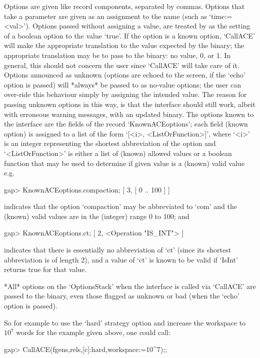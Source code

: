 \endlist

Options  are  given  like  record  components,  separated  by  commas.
Options that take a parameter are  given as an  assignment to the name
(such  as `time:=<val>').   Options passed without assigning a value,
are treated by {\GAP} as the setting of a boolean option to the value
`true'. If the option is a known {\ACE} option, `CallACE' will   make
the   appropriate  translation  to  the value expected by the  {\ACE}
binary; the appropriate translation may be to pass to the binary:  no
value, 0, or 1.  In general,  this  should not concern the user since
`CallACE' will take care of it. Options announced as unknown (options
are  echoed  to  the  screen,  if  the  `echo' option is passed) will
*always*  be  passed to  {\ACE} as no-value  options;  the  user  can
over-ride this behaviour  simply by assigning the intended value. The
reason for  passing  unknown  options in this way, is that the {\ACE} 
interface should still work,  albeit with erroneous warning messages,
with  an  updated  binary. The  {\ACE}  options  known  to the {\ACE} 
interface are the fields of the record `KnownACEoptions';  each field
(known {\ACE} option) is assigned to a list of the form
`[<i>, <ListOrFunction>]', where `<i>' is an integer representing the
shortest abbreviation of the option and `<ListOrFunction>' is  either
a list of (known) allowed values or a boolean function that  may   be 
used to determine if given value is a (known) valid value e.g.

\begintt
gap> KnownACEoptions.compaction;
[ 3, [ 0 .. 100 ] ]
\endtt

indicates that the option `compaction' may be  abbreviated  to  `com'
and the (known) valid values are in the (integer) range 0 to 100; and

\begintt
gap> KnownACEoptions.ct;
[ 2, <Operation "IS_INT"> ]
\endtt

indicates that there is essentially no abbreviation of `ct' (since its
shortest abbreviation is of length 2),  and a value of  `ct' is  known
to be valid if `IsInt' returns true for that value.

*All* options on the `OptionsStack' when the {\ACE} interface is called
via `CallACE' are passed to the {\ACE} binary, even those flagged   as
unknown or bad (when the `echo' option is passed).

So  for example to  use the  `hard' strategy  option and  increase the
workspace to $10^7$ words for the example given above, one could call:

\begintt
gap> CallACE(fgens,rels,[c]:hard,workspace:=10^7);;
\endtt

